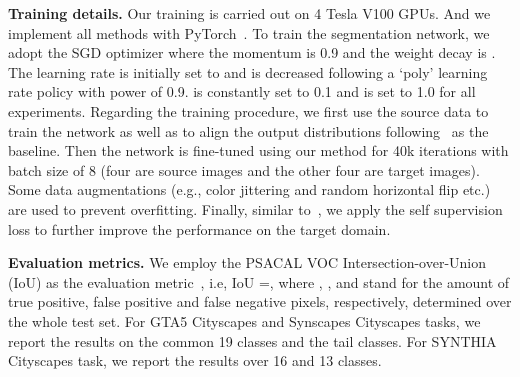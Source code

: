 \documentclass[runningheads]{llncs}
\begin{document}
\textbf{Training details.} Our training is carried out on 4 Tesla V100 GPUs. And we implement all methods with PyTorch~\cite{paszke2019pytorch}. To train the segmentation network, we adopt the SGD optimizer where the momentum is 0.9 and the weight decay is . The learning rate is initially set to  and is decreased following a `poly' learning rate policy with power of 0.9.  is constantly set to 0.1 and  is set to 1.0 for all experiments. 
Regarding the training procedure, we first use the source data to train the network as well as to align the output distributions following~\cite{tsai2018learning} as the baseline. Then the network is fine-tuned using our method for 40k iterations with batch size of 8 (four are source images and the other four are target images). Some data augmentations (e.g., color jittering and random horizontal flip etc.) are used to prevent overfitting. Finally, similar to~\cite{li2019bidirectional,pan2020unsupervised,wang2020class,wang2020differential}, we apply the self supervision loss to further improve the performance on the target domain. 

\textbf{Evaluation metrics.} We employ the PSACAL VOC Intersection-over-Union (IoU) as the evaluation metric~\cite{everingham2015IoU}, i.e, IoU =, where , , and  stand for the amount of true positive, false positive and false negative pixels, respectively, determined over the whole test set. For GTA5  Cityscapes and Synscapes  Cityscapes tasks, we report the results on the common 19 classes and the tail classes. For SYNTHIA  Cityscapes task, we report the results over 16 and 13 classes.
\end{document}

